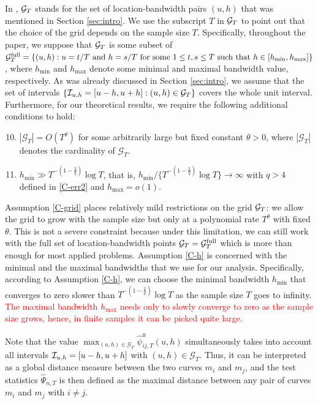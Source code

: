 \documentclass[a4paper,12pt]{article}
\makeatletter
\renewcommand{\eqref}[1]{\tagform@{\ref{#1}}}
\makeatother
\begin{document}
In \eqref{eq:Psi_hat}, $\mathcal{G}_T$ stands for the set of location-bandwidth pairs $(u, h)$ that was mentioned in Section \ref{sec:intro}. We use the subscript $T$ in $\mathcal{G}_T$ to point out that the choice of the grid depends on the sample size $T$. Specifically, throughout the paper, we suppose that $\mathcal{G}_T$ is some subset of $\grid^{\text{full}} = \{ (u, h): u = t/T \text{ and } h = s/T \text{ for some } 1 \le t, s \le T \text{ such that } \linebreak h \in [h_{\min},h_{\max}] \}$, where $h_{\min}$ and $h_{\max}$ denote some minimal and maximal bandwidth value, respectively. As was already discussed in Section \ref{sec:intro}, we assume that the set of intervals $\{\mathcal{I}_{u, h} = [u-h, u+h]: (u, h) \in \mathcal{G}_T\}$ covers the whole unit interval. Furthermore, for our theoretical results, we require the following additional conditions to hold:
\begin{enumerate}[label=(C\arabic*),leftmargin=1.05cm]
\setcounter{enumi}{9}

\item \label{C-grid} $|\mathcal{G}_T| = O(T^\theta)$ for some arbitrarily large but fixed constant $\theta > 0$, where $|\mathcal{G}_T|$ denotes the cardinality of $\mathcal{G}_T$. 

\item \label{C-h} $h_{\min} \gg T^{-(1-\frac{2}{q})} \log T$, that is, $h_{\min} / \{ T^{-(1-\frac{2}{q})} \log T \} \rightarrow \infty$ with $q > 4$ defined in \ref{C-err2} and $h_{\max} = o(1)$.

\end{enumerate}
Assumption \ref{C-grid} places relatively mild restrictions on the grid $\mathcal{G}_T$: we allow the grid to grow with the sample size but only at a polynomial rate $T^\theta$ with fixed $\theta$. This is not a severe constraint because under this limitation, we can still work with the full set of location-bandwidth points $\mathcal{G}_T = \mathcal{G}_T^{\text{full}}$ which is more than enough for most applied problems. Assumption \ref{C-h} is concerned with the minimal and the maximal bandwidths that we use for our analysis. Specifically, according to Assumption \ref{C-h}, we can choose the minimal bandwidth $h_{\min}$ that converges to zero slower than $T^{-(1-\frac{2}{q})} \log T$ as the sample size $T$ goes to infinity. \textcolor{red}{The maximal bandwidth $h_{\max}$ needs only to slowly converge to zero as the sample size grows, hence, in finite samples it can be picked quite large.}

Note that the value $\max_{(u, h) \in \mathcal{G}_T} \hat{\psi}^0_{ij, T}(u, h)$ simultaneously takes into account all intervals $\mathcal{I}_{u, h} = [u- h, u+h]$ with $(u, h) \in \mathcal{G}_T$. Thus, it can be interpreted as a global distance measure between the two curves $m_i$ and $m_j$, and the test statistics $\widehat{\Psi}_{n,T}$ is then defined as the maximal distance between any pair of curves $m_i$ and $m_j$ with $i \ne j$.
\end{document}
